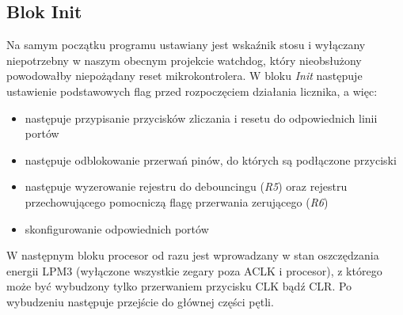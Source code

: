 \documentclass[fleqn]{article}
\begin{document}
\subsection{Blok Init}
		Na samym początku programu ustawiany jest wskaźnik stosu i wyłączany niepotrzebny w naszym obecnym projekcie watchdog, który nieobsłużony powodowałby niepożądany reset mikrokontrolera.
		W bloku \textit{Init} następuje ustawienie podstawowych flag przed rozpoczęciem działania licznika, a więc:
		\begin{itemize}
			\item następuje przypisanie przycisków zliczania i resetu do odpowiednich linii portów
			\item następuje odblokowanie przerwań pinów, do których są podłączone przyciski
			\item następuje wyzerowanie rejestru do debouncingu (\textit{R5}) oraz rejestru przechowującego pomocniczą flagę przerwania zerującego (\textit{R6})
			\item skonfigurowanie odpowiednich portów
		\end{itemize}

		W następnym bloku procesor od razu jest wprowadzany w stan oszczędzania energii LPM3 (wyłączone wszystkie zegary poza ACLK i procesor), z którego może być wybudzony tylko przerwaniem przycisku CLK bądź CLR. Po wybudzeniu następuje przejście do głównej części pętli.
\end{document}
